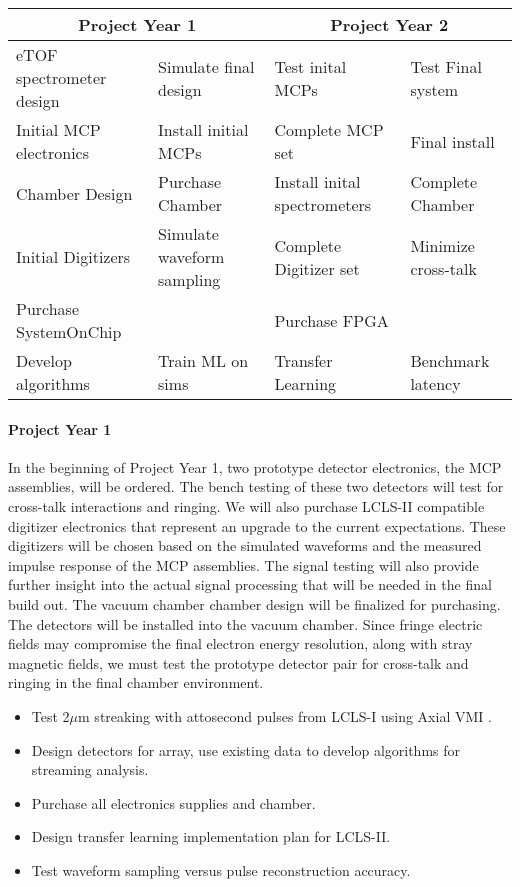 \small
\begin{tabular}{l|l|l|l}
\hline
\multicolumn{2}{c|}{Project Year 1} &  \multicolumn{2}{c}{Project Year 2} \\
\hline
eTOF spectrometer design & Simulate final design & Test inital MCPs & Test Final system\\
Initial MCP electronics & Install initial MCPs & Complete MCP set & Final install\\
Chamber Design & Purchase Chamber& Install inital spectrometers & Complete Chamber\\
Initial Digitizers & Simulate waveform sampling& Complete Digitizer set & Minimize cross-talk\\
\hline
Purchase SystemOnChip & & Purchase FPGA &\\
Develop algorithms& Train ML on sims & Transfer Learning & Benchmark latency\\
\hline
\end{tabular}
\normalsize

\paragraph*{Project Year 1}
In the beginning of Project Year 1, two prototype detector electronics, the MCP assemblies, will be ordered.
The bench testing of these two detectors will test for cross-talk interactions and ringing.
We will also purchase LCLS-II compatible digitizer electronics that represent an upgrade to the current expectations.
These digitizers will be chosen based on the simulated waveforms and the measured impulse response of the MCP assemblies.
The signal testing will also provide further insight into the actual signal processing that will be needed in the final build out.  
The vacuum chamber chamber design will be finalized for purchasing. 
The detectors will be installed into the vacuum chamber.
Since fringe electric fields may compromise the final electron energy resolution, along with stray magnetic fields, we must test the prototype detector pair for cross-talk and ringing in the final chamber environment.  
\begin{itemize}
\item Test 2$\mu$m streaking with attosecond pulses from LCLS-I using Axial VMI \cite{Siqi2018}.
\item Design detectors for array, use existing data to develop algorithms for streaming analysis.
\item Purchase all electronics supplies and chamber.
\item Design transfer learning implementation plan for LCLS-II.
\item Test waveform sampling versus pulse reconstruction accuracy.
\end{itemize}

